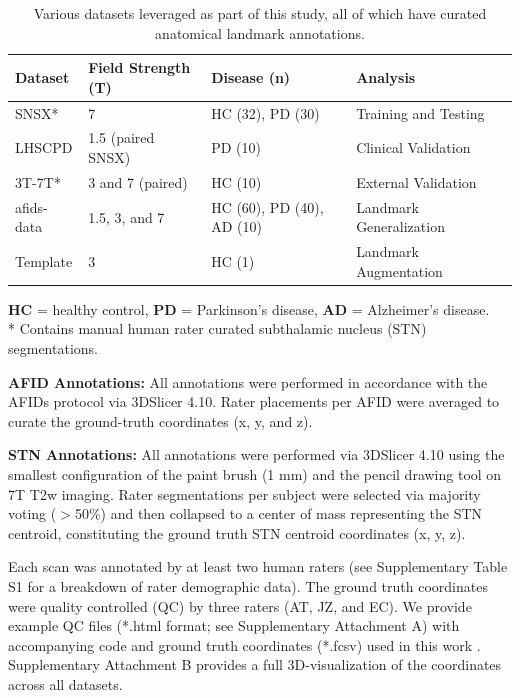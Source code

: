\begin{table}[h!]
\centering
\caption{Various datasets leveraged as part of this study, all of which have curated anatomical landmark annotations.}
\begin{tabularx}{\textwidth}{l l l l l}
\toprule
\textbf{Dataset} & \textbf{Field Strength (T)} & \textbf{Disease (n)} & \textbf{Analysis} \\
\midrule
SNSX* & 7 & HC (32), PD (30) & Training and Testing  \\
LHSCPD & 1.5 (paired SNSX) & PD (10) & Clinical Validation \\
3T-7T* & 3 and 7 (paired) & HC (10) & External Validation  \\
afids-data & 1.5, 3, and 7 & HC (60), PD (40), AD (10) & Landmark Generalization \\
Template & 3 & HC (1) & Landmark Augmentation  \\
\bottomrule
\end{tabularx}

\vspace{1ex}
\raggedright
\footnotesize{
\textbf{HC} = healthy control, \textbf{PD} = Parkinson’s disease, \textbf{AD} = Alzheimer’s disease.\\
* Contains manual human rater curated subthalamic nucleus (STN) segmentations.
}
\label{tab:afidpred_datasets}
\end{table}

\textbf{AFID Annotations:} All annotations were performed in accordance with the AFIDs protocol via 3DSlicer 4.10. Rater placements per AFID were averaged to curate the ground-truth coordinates (x, y, and z).

\textbf{STN Annotations:} All annotations were performed via 3DSlicer 4.10 \cite{Fedorov2012-rk} using the smallest configuration of the paint brush (1 mm) and the pencil drawing tool on 7T T2w imaging. Rater segmentations per subject were selected via majority voting (\(>\)50\%) and then collapsed to a center of mass representing the STN centroid, constituting the ground truth STN centroid coordinates (x, y, z).

Each scan was annotated by at least two human raters (see Supplementary Table S1 for a breakdown of rater demographic data). The ground truth coordinates were quality controlled (QC) by three raters (AT, JZ, and EC). We provide example QC files (*.html format; see Supplementary Attachment A) with accompanying code and ground truth coordinates (*.fcsv) used in this work \cite{ref}. Supplementary Attachment B provides a full 3D-visualization of the coordinates across all datasets.


